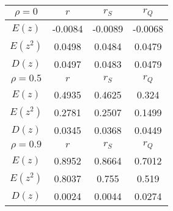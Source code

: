 \begin{tabular}{| c | c | c | c |} \hline
$\rho = 0$ & $r$ & $r_S$ & $r_Q$ \\ \hline 
$E(z)$ & -0.0084 & -0.0089 & -0.0068 \\ 
$E(z^2)$ & 0.0498 & 0.0484 & 0.0479 \\ 
$D(z)$ & 0.0497 & 0.0483 & 0.0479 \\ \hline 
$\rho = 0.5$ & $r$ & $r_S$ & $r_Q$ \\ \hline 
$E(z)$ & 0.4935 & 0.4625 & 0.324 \\ 
$E(z^2)$ & 0.2781 & 0.2507 & 0.1499 \\ 
$D(z)$ & 0.0345 & 0.0368 & 0.0449 \\ \hline 
$\rho = 0.9$ & $r$ & $r_S$ & $r_Q$ \\ \hline 
$E(z)$ & 0.8952 & 0.8664 & 0.7012 \\ 
$E(z^2)$ & 0.8037 & 0.755 & 0.519 \\ 
$D(z)$ & 0.0024 & 0.0044 & 0.0274 \\ \hline 
\end{tabular}